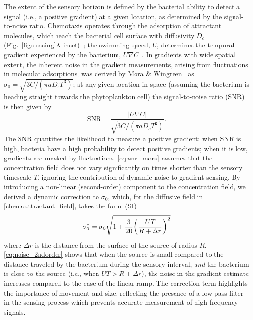 \documentclass[9pt,twocolumn,twoside]{pnas-new}
\newcommand{\SNR}{\mathrm{SNR}}
\begin{document}
The extent of the sensory horizon is defined by the bacterial ability to detect a signal (i.e., a positive gradient) at a given location, as determined by the signal-to-noise ratio.
Chemotaxis operates through the adsorption of attractant molecules, which reach the bacterial cell surface with diffusivity $D_c$ (Fig.~\ref{fig:sensing}A inset)~\cite{berg1977physics}; the swimming speed, $U$, determines the temporal gradient experienced by the bacterium, $U\nabla C$~\cite{berg1977physics,hein2016physical}.
In gradients with wide spatial extent, the inherent noise in the gradient measurements, arising from fluctuations in molecular adsorptions, was derived by Mora \& Wingreen~\cite{mora2010limits} as $\sigma_0 = \sqrt{3C/(\pi a D_c T^3)}$; at any given location in space (assuming the bacterium is heading straight towards the phytoplankton cell) the signal-to-noise ratio ($\SNR$) is then given by
\begin{equation}\label{eq:snr_mora}
    \SNR = \dfrac{|U\nabla C|}{\sqrt{3C/(\pi a D_c T^3)}}.
\end{equation}
The $\SNR$ quantifies the likelihood to measure a positive gradient: 
when $\SNR$ is high, bacteria have a high probability to detect positive gradients; when it is low, gradients are masked by fluctuations.
\eqref{eq:snr_mora} assumes that the concentration field does not vary significantly on times shorter than the sensory timescale $T$, ignoring the contribution of dynamic noise to gradient sensing. By introducing a non-linear (second-order) component to the concentration field, we derived a dynamic correction to $\sigma_0$, which, for the diffusive field in \eqref{chemoattractant_field}, takes the form~(SI)
\begin{equation}\label{eq:noise_2ndorder}
  \sigma_0^* = \sigma_0\sqrt{1 + \dfrac{3}{20}\qty(\dfrac{UT}{R+\Delta r})^2}
\end{equation}
where $\Delta r$ is the distance from the surface of the source of radius $R$. \eqref{eq:noise_2ndorder} shows that when the source is small compared to the distance traveled by the bacterium during the sensory interval, \emph{and} the bacterium is close to the source (i.e., when $UT>R+\Delta r$), the noise in the gradient estimate increases compared to the case of the linear ramp. The correction term highlights the importance of movement and size, reflecting the presence of a low-pass filter in the sensing process which prevents accurate measurement of high-frequency signals.
\end{document}
